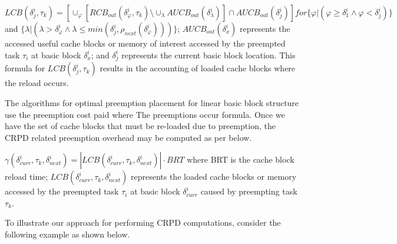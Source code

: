 \begin{math}LCB(\delta_{j}^{i},\tau_{k}) = [\cup_\varphi [RCB_{out}(\delta_{\varphi}^{i},\tau_{k}) \setminus \cup_\lambda AUCB_{out}(\delta_{\lambda}^{i})] \cap AUCB_{out}(\delta_{j}^{i})] for \{\varphi | (\varphi \geq \delta_{1}^{i} \wedge \varphi < \delta_{j}^{i})\}\end{math} and \begin{math}\{\lambda | (\lambda > \delta_{\varphi}^{i} \wedge \lambda \leq min(\delta_{j}^{i},\rho_{next}(\delta_{\varphi}^{i})))\}\end{math}; \begin{math}AUCB_{out}(\delta_{x}^{i})\end{math} represents the accessed useful cache blocks or memory of interest accessed by the preempted task \begin{math}\tau_{i}\end{math} at basic block \begin{math}\delta_{x}^{i}\end{math}; and \begin{math}\delta_{j}^{i}\end{math} represents the current basic block location.  This formula for \begin{math}LCB(\delta_{j}^{i},\tau_{k})\end{math} results in the accounting of loaded cache blocks where the reload occurs.

The algorithms for optimal preemption placement for linear basic block structure use the preemption cost paid where The preemptions occur formula.  Once we have the set of cache blocks that must be re-loaded due to preemption, the CRPD related preemption overhead may be computed as per below.

\begin{math}\gamma(\delta_{curr}^{i},\tau_{k},\delta_{next}^{i}) = | LCB(\delta_{curr}^{i},\tau_{k},\delta_{next}^{i}) | \cdot BRT\end{math} where BRT is the cache block reload time; \begin{math}LCB(\delta_{curr}^{i},\tau_{k},\delta_{next}^{i})\end{math} represents the loaded cache blocks or memory accessed by the preempted task \begin{math}\tau_{i}\end{math} at basic block \begin{math}\delta_{curr}^{i}\end{math} caused by preempting task \begin{math}\tau_{k}\end{math}.

To illustrate our approach for performing CRPD computations, consider the following example as shown below.


